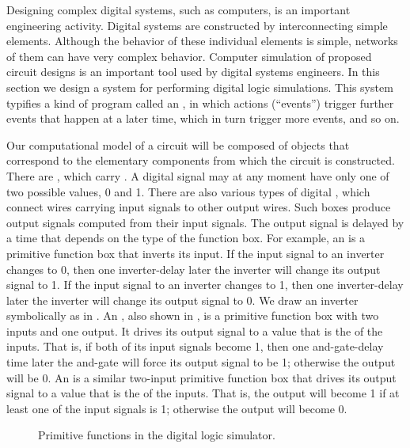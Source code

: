 Designing complex digital systems, such as computers, is an important
engineering activity.  Digital systems are constructed by interconnecting
simple elements.  Although the behavior of these individual elements is simple,
networks of them can have very complex behavior.  Computer simulation of
proposed circuit designs is an important tool used by digital systems
engineers.  In this section we design a system for performing digital logic
simulations.  This system typifies a kind of program called an
, in which actions (``events'') trigger
further events that happen at a later time, which in turn trigger more events,
and so on.

Our computational model of a circuit will be composed of objects that
correspond to the elementary components from which the circuit is constructed.
There are , which carry .  A digital
signal may at any moment have only one of two possible values, 0 and 1.  There
are also various types of digital , which connect wires
carrying input signals to other output wires.  Such boxes produce output
signals computed from their input signals.  The output signal is delayed by a
time that depends on the type of the function box.  For example, an
 is a primitive function box that inverts its input.  If the
input signal to an inverter changes to 0, then one inverter-delay later the
inverter will change its output signal to 1.  If the input signal to an
inverter changes to 1, then one inverter-delay later the inverter will change
its output signal to 0.  We draw an inverter symbolically as in .
An , also shown in , is a primitive
function box with two inputs and one output.  It drives its output signal to a
value that is the  of the inputs.  That is, if both of its
input signals become 1, then one and-gate-delay time later the and-gate will
force its output signal to be 1; otherwise the output will be 0.  An
 is a similar two-input primitive function box that drives its
output signal to a value that is the  of the inputs.  That
is, the output will become 1 if at least one of the input signals is 1;
otherwise the output will become 0.

\begin{figure}[tb]
\label{Figure 3.24}
\centering
\begin{comment}
\heading{Figure 3.24:} Primitive functions in the digital logic simulator.

\begin{example}
               __          ___
  |\        --|  \       --\  \
--| >o--      |   )--       )  >--
  |/        --|__/       --/__/

Inverter    And-gate     Or-gate
\end{example}
\end{comment}

\par\bigskip
\noindent
{} Primitive functions in the digital logic simulator. 
\end{figure}

